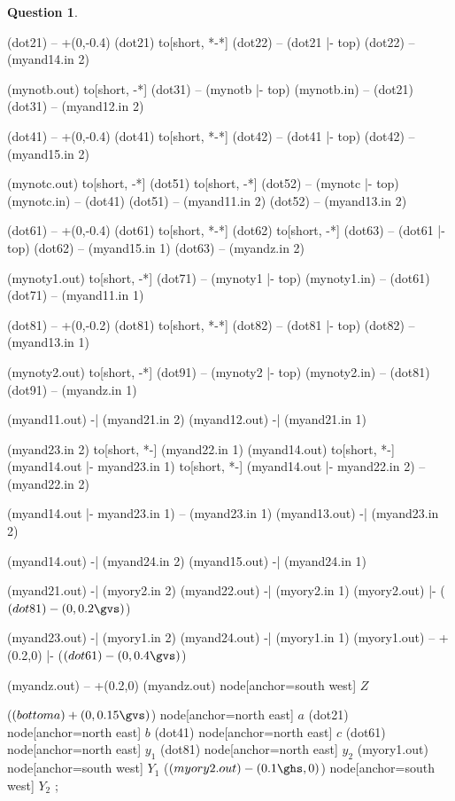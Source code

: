\documentclass[11pt,a4paper]{article}
\theoremstyle{definition}%
\newtheorem{Q}{Question}[] %
\newlength{\gvs}%
\newlength{\ghs}%
\begin{document}
\begin{Q}
{\begin{circuitikz}[scale=0.8, every node/.style={scale=0.8}]
				(dot21) -- +(0,-0.4\gvs)
				(dot21) to[short, *-*] (dot22) -- (dot21 |- top)
				(dot22) -- (myand14.in 2)

				(mynotb.out) to[short, -*] (dot31) -- (mynotb |- top)
				(mynotb.in) -- (dot21)
				(dot31) -- (myand12.in 2)

				(dot41) -- +(0,-0.4\gvs)
				(dot41) to[short, *-*] (dot42) -- (dot41 |- top)
				(dot42) -- (myand15.in 2)

				(mynotc.out) to[short, -*] (dot51) to[short, -*] (dot52) -- (mynotc |- top)
				(mynotc.in) -- (dot41)
				(dot51) -- (myand11.in 2)
				(dot52) -- (myand13.in 2)

				(dot61) -- +(0,-0.4\gvs)
				(dot61) to[short, *-*] (dot62) to[short, -*] (dot63) -- (dot61 |- top)
				(dot62) -- (myand15.in 1)
				(dot63) -- (myandz.in 2)

				(mynoty1.out) to[short, -*] (dot71) -- (mynoty1 |- top)
				(mynoty1.in) -- (dot61)
				(dot71) -- (myand11.in 1)

				(dot81) -- +(0,-0.2\gvs)
				(dot81) to[short, *-*] (dot82) -- (dot81 |- top)
				(dot82) -- (myand13.in 1)

				(mynoty2.out) to[short, -*] (dot91) -- (mynoty2 |- top)
				(mynoty2.in) -- (dot81)
				(dot91) -- (myandz.in 1)
				
				(myand11.out) -| (myand21.in 2)
				(myand12.out) -| (myand21.in 1)

				(myand23.in 2) to[short, *-] (myand22.in 1)
				(myand14.out) to[short, *-] (myand14.out |- myand23.in 1) to[short, *-] (myand14.out |- myand22.in 2) -- (myand22.in 2)

				(myand14.out |- myand23.in 1) -- (myand23.in 1)
				(myand13.out) -| (myand23.in 2)

				(myand14.out) -| (myand24.in 2)
				(myand15.out) -| (myand24.in 1)

				(myand21.out) -| (myory2.in 2)
				(myand22.out) -| (myory2.in 1)
				(myory2.out) |- ($(dot81)-(0,0.2\gvs)$)

				(myand23.out) -| (myory1.in 2)
				(myand24.out) -| (myory1.in 1)
				(myory1.out) -- +(0.2\gvs,0) |- ($(dot61)-(0,0.4\gvs)$)

				(myandz.out) -- +(0.2\ghs,0)
				(myandz.out) node[anchor=south west] {\Large $Z$}
		
				($(bottoma)+(0,0.15\gvs)$) node[anchor=north east] {\Large $a$}
				(dot21) node[anchor=north east] {\Large $b$}
				(dot41) node[anchor=north east] {\Large $c$}
				(dot61) node[anchor=north east] {\Large $y_1$}
				(dot81) node[anchor=north east] {\Large $y_2$}
				(myory1.out) node[anchor=south west] {\Large $Y_1$}
				($(myory2.out)-(0.1\ghs,0)$) node[anchor=south west] {\Large $Y_2$}
				;
			\end{circuitikz}
	}

\end{Q}	
\end{document}
